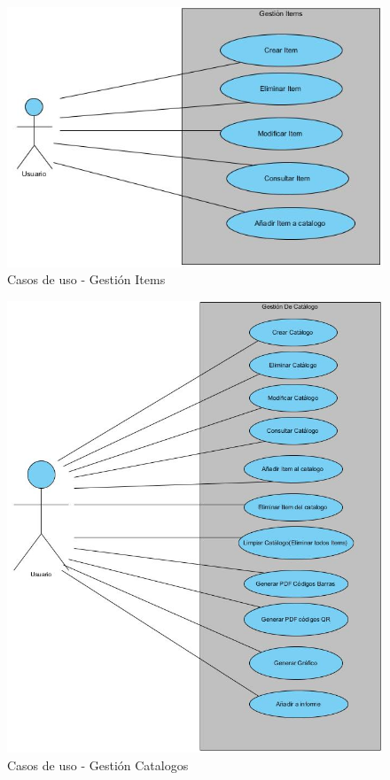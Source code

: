 \documentclass[a4paper,11pt]{book}
\begin{document}
\begin{figure}[htbpH]  
\centering 
\includegraphics[scale=0.50]{imagenes/casosUso/gestionItem.jpg}
\caption{ Casos de uso - Gestión Items  }  
\end{figure}

\begin{figure}[H] 
\centering 
\includegraphics[scale=0.50]{imagenes/casosUso/gestionCatalogo.jpg}
\caption{ Casos de uso - Gestión Catalogos  }  
\end{figure}
\end{document}
